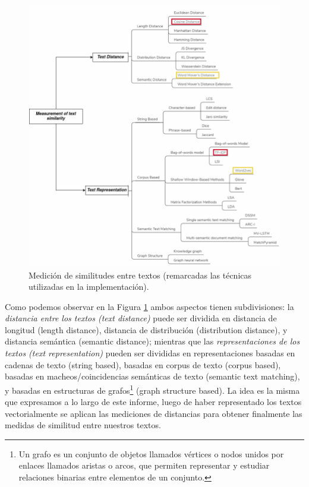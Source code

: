 \documentclass[12pt,a4paper]{article}
\begin{document}
\begin{sloppypar}
\begin{figure}[H]    
 \centering
 \includegraphics[width=1\textwidth]{images/NLP/33.png}
 \captionsetup{justification=centering,margin=2cm}
 \caption{Medición de similitudes entre textos (remarcadas las técnicas utilizadas en la implementación)\cite{similarity_survey}.}
 \label{fig:Imagen_NLP_33}
\end{figure}

Como podemos observar en la Figura \ref{fig:Imagen_NLP_33} ambos aspectos tienen subdivisiones: la \textit{distancia entre los textos (text distance)} puede ser dividida en distancia de longitud (length distance), distancia de distribución (distribution distance), y distancia semántica (semantic distance); mientras que las \textit{representaciones de los textos (text representation)} pueden ser divididas en representaciones basadas en cadenas de texto (string based), basadas en corpus de texto (corpus based), basadas en macheos/coincidencias semánticas de texto (semantic text matching), y basadas en estructuras de grafos\footnote{Un grafo es un conjunto de objetos llamados vértices o nodos unidos por enlaces llamados aristas o arcos, que permiten representar y estudiar relaciones binarias entre elementos de un conjunto.} (graph structure based). La idea es la misma que expresamos a lo largo de este informe, luego de haber representado los textos vectorialmente se aplican las mediciones de distancias para obtener finalmente las medidas de similitud entre nuestros textos.


\end{sloppypar}
\end{document}
